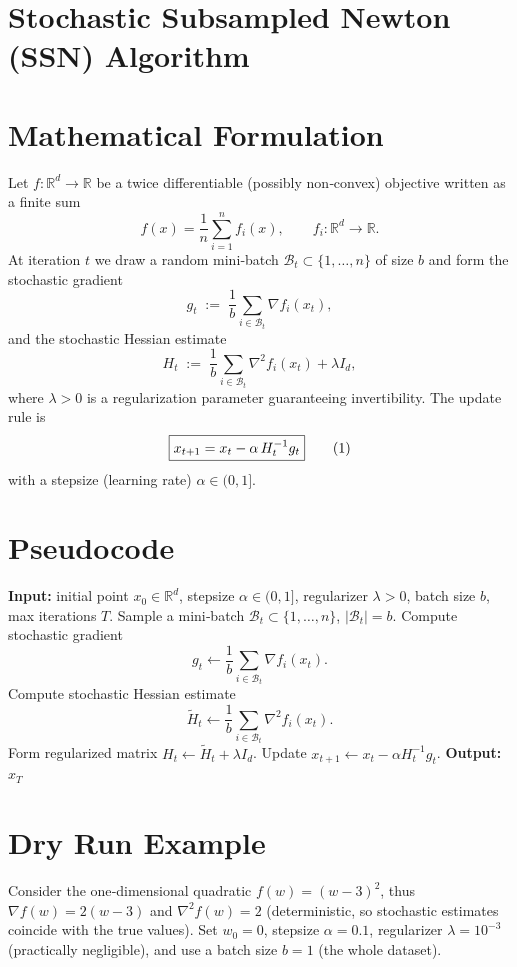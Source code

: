 \documentclass{article}
\newcommand{\RR}{\mathbb{R}}
\begin{document}
\section*{Stochastic Subsampled Newton (SSN) Algorithm}

\section*{Mathematical Formulation}
Let $f:\RR^{d}\to\RR$ be a twice differentiable (possibly non‑convex) objective written as a finite sum
\[
f(x)=\frac{1}{n}\sum_{i=1}^{n} f_i(x),\qquad 
f_i:\RR^{d}\to\RR .
\]
At iteration $t$ we draw a random mini‑batch $\mathcal{B}_t\subset\{1,\dots,n\}$ of size $b$ and form the stochastic gradient
\[
g_t\;:=\;\frac{1}{b}\sum_{i\in\mathcal{B}_t}\nabla f_i(x_t),
\]
and the stochastic Hessian estimate
\[
H_t\;:=\;\frac{1}{b}\sum_{i\in\mathcal{B}_t}\nabla^{2} f_i(x_t) + \lambda I_d ,
\]
where $\lambda>0$ is a regularization parameter guaranteeing invertibility.  
The update rule is
\[
\boxed{%
x_{t+1}=x_t-\alpha\, H_t^{-1} g_t
}\tag{1}
\]
with a stepsize (learning rate) $\alpha\in(0,1]$.

\section*{Pseudocode}
\begin{algorithm}[H]
\caption{Stochastic Subsampled Newton (SSN)}
\begin{algorithmic}[1]
\State \textbf{Input:} initial point $x_0\in\RR^{d}$, stepsize $\alpha\in(0,1]$, regularizer $\lambda>0$, batch size $b$, max iterations $T$.
    \State Sample a mini‑batch $\mathcal{B}_t\subset\{1,\dots,n\}$, $|\mathcal{B}_t|=b$.
    \State Compute stochastic gradient 
    \[
    g_t\gets \frac{1}{b}\sum_{i\in\mathcal{B}_t}\nabla f_i(x_t).
    \]
    \State Compute stochastic Hessian estimate 
    \[
    \widetilde H_t\gets \frac{1}{b}\sum_{i\in\mathcal{B}_t}\nabla^{2} f_i(x_t).
    \]
    \State Form regularized matrix $H_t\gets \widetilde H_t+\lambda I_d$.
    \State Update $x_{t+1}\gets x_t-\alpha H_t^{-1} g_t$.
\EndFor
\State \textbf{Output:} $x_T$
\end{algorithmic}
\end{algorithm}

\section*{Dry Run Example}
Consider the one‑dimensional quadratic $f(w)=(w-3)^2$, thus $\nabla f(w)=2(w-3)$ and $\nabla^{2}f(w)=2$ (deterministic, so stochastic estimates coincide with the true values).  
Set $w_0=0$, stepsize $\alpha=0.1$, regularizer $\lambda=10^{-3}$ (practically negligible), and use a batch size $b=1$ (the whole dataset).
\end{document}
